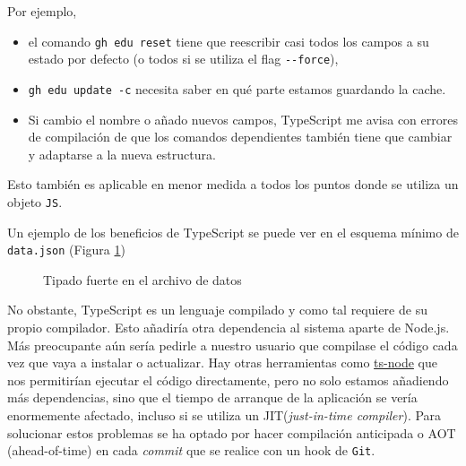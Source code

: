 Por ejemplo, 

\begin{itemize}
    \item el comando \verb|gh edu reset| tiene 
    que reescribir casi todos los campos a su estado por 
    defecto (o todos si se utiliza el flag \verb|--force|), 
    \item 
    \verb|gh edu update -c| necesita saber 
    en qué parte estamos guardando la \gls{cache}. 
    \item 
    Si cambio el nombre o añado nuevos campos, 
    TypeScript me avisa con errores de compilación de 
    que los comandos dependientes también tiene que cambiar y 
    adaptarse a la nueva estructura. 
\end{itemize}

Esto también es aplicable en menor medida a todos 
los puntos donde se utiliza un objeto \verb|JS|.

Un ejemplo de los beneficios de TypeScript se puede 
ver en el esquema mínimo de {\tt data.json} 
(Figura \ref{fig:configType})

\begin{figure}[htb]
    \centering
    \caption{Tipado fuerte en el archivo de datos}
    \label{fig:configType}
\end{figure}

No obstante, TypeScript es un lenguaje compilado y como tal requiere de su propio compilador. 
Esto añadiría otra dependencia al sistema aparte de Node.js. 
Más preocupante aún sería pedirle a nuestro usuario que compilase el código cada vez que vaya a instalar o actualizar.
Hay otras herramientas como \href{https://www.npmjs.com/package/ts-node}{ts-node} que nos permitirían ejecutar el código directamente, pero no solo estamos añadiendo más dependencias, sino que el tiempo de arranque de la aplicación se vería enormemente afectado, incluso si se utiliza un \gls{JIT}(\emph{just-in-time compiler}). 
Para solucionar estos problemas se ha optado por hacer compilación anticipada o \gls{AOT} (ahead-of-time) en cada \emph{commit} que se realice con un hook\cite{hook} de \verb|Git|.

